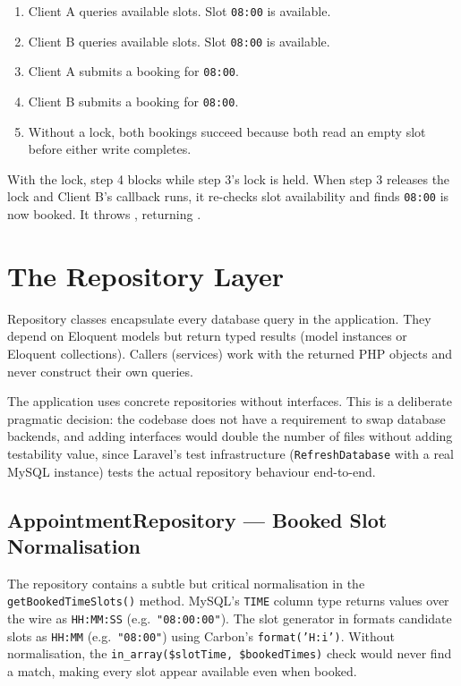 \begin{enumerate}
  \item Client A queries available slots. Slot \texttt{08:00} is available.
  \item Client B queries available slots. Slot \texttt{08:00} is available.
  \item Client A submits a booking for \texttt{08:00}.
  \item Client B submits a booking for \texttt{08:00}.
  \item Without a lock, both bookings succeed because both read an empty
    slot before either write completes.
\end{enumerate}

With the lock, step 4 blocks while step 3's lock is held. When step 3
releases the lock and Client B's callback runs, it re-checks slot
availability and finds \texttt{08:00} is now booked. It throws
, returning \stconflict{}.

\section{The Repository Layer}
\label{sec:repository-layer}

Repository classes encapsulate every database query in the application.
They depend on Eloquent models but return typed results (model instances
or Eloquent collections). Callers (services) work with the returned
PHP objects and never construct their own queries.

The application uses concrete repositories without interfaces. This is
a deliberate pragmatic decision: the codebase does not have a
requirement to swap database backends, and adding interfaces would double
the number of files without adding testability value, since Laravel's
test infrastructure (\texttt{RefreshDatabase} with a real MySQL instance)
tests the actual repository behaviour end-to-end.

\subsection{AppointmentRepository --- Booked Slot Normalisation}
\label{sec:time-normalisation}

The repository contains a subtle but critical normalisation in the
\texttt{getBookedTimeSlots()} method. MySQL's \texttt{TIME} column type
returns values over the wire as \texttt{HH:MM:SS}
(e.g.\ \texttt{"08:00:00"}). The slot generator in
 formats candidate slots as \texttt{HH:MM}
(e.g.\ \texttt{"08:00"}) using Carbon's \texttt{format('H:i')}. Without
normalisation, the \texttt{in\_array(\$slotTime, \$bookedTimes)} check
would never find a match, making every slot appear available even when
booked.

